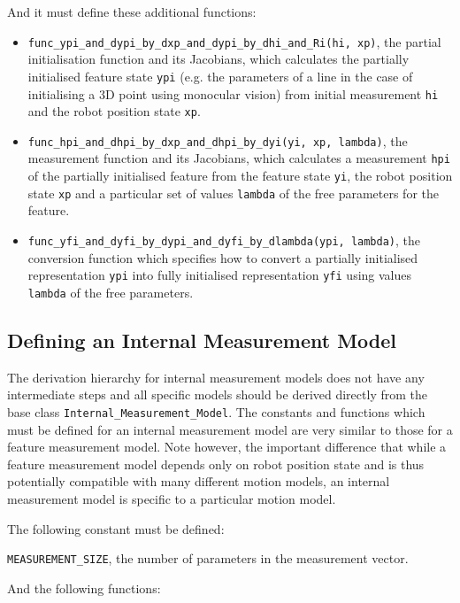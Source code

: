 \documentclass{article}
\begin{document}
And it must define these additional functions:
\begin{itemize}
\item {\tt func\_ypi\_and\_dypi\_by\_dxp\_and\_dypi\_by\_dhi\_and\_Ri(hi,
    xp)}, the partial initialisation function and its Jacobians, which
  calculates the partially initialised feature state {\tt ypi} (e.g. the
  parameters of a line in the case of initialising a 3D point using monocular vision) from initial measurement {\tt hi}
  and the robot position state {\tt xp}.
\item {\tt func\_hpi\_and\_dhpi\_by\_dxp\_and\_dhpi\_by\_dyi(yi, xp, lambda)},
  the measurement function and its Jacobians, which calculates a
  measurement {\tt hpi} of the partially initialised feature from the
  feature state {\tt yi}, the robot
  position state {\tt xp} and a particular set of values {\tt lambda} of
  the free parameters for the feature.
\item {\tt func\_yfi\_and\_dyfi\_by\_dypi\_and\_dyfi\_by\_dlambda(ypi,
    lambda)}, the conversion function which specifies how to convert a
  partially initialised representation {\tt ypi} into fully initialised
  representation  {\tt yfi} using values {\tt lambda} of the free parameters.
\end{itemize}

\subsection{Defining an Internal Measurement Model}

The derivation hierarchy for internal measurement models does not have
any intermediate steps and all specific models should be derived
directly from the base class {\tt Internal\_Measurement\_Model}.  The
constants and functions which must be defined for an internal
measurement model are very similar to those for a feature measurement
model. Note however, the important difference that while a feature
measurement model depends only on robot position state and is thus
potentially compatible with many different motion models, an internal
measurement model is specific to a particular motion model.

  The following constant must be defined:

  \be
\item {\tt MEASUREMENT\_SIZE}, the number of parameters in the
  measurement vector.
  \ee

  And the following functions:
\end{document}
